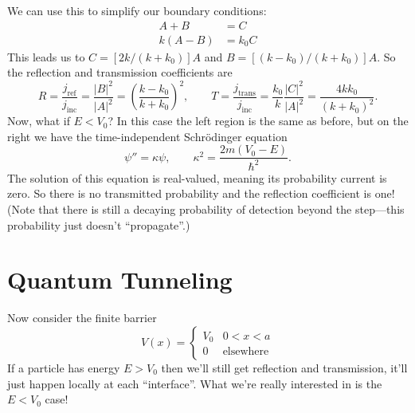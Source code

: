 \documentclass[../p052main.tex]{subfiles}
\begin{document}
We can use this to simplify our boundary conditions:
\begin{align*}
    A + B &= C \\
    k(A - B) &= k_0 C
\end{align*}
This leads us to $C = [2k / (k + k_0)] A$ and $B = [(k - k_0) / (k + k_0)]A$.
So the reflection and transmission coefficients are
\[ R = \frac{j_\textrm{ref}}{j_\textrm{inc}} = \frac{|B|^2}{|A|^2} = \left( \frac{k - k_0}{k + k_0} \right)^2, \qquad T = \frac{j_\textrm{trans}}{j_\textrm{inc}} = \frac{k_0}{k} \frac{|C|^2}{|A|^2} = \frac{4kk_0}{(k + k_0)^2}. \]
Now, what if $E < V_0$?
In this case the left region is the same as before, but on the right we have the time-independent Schrödinger equation
\[ \psi'' = \kappa \psi, \qquad \kappa^2 = \frac{2m(V_0 - E)}{\hbar^2}. \]
The solution of this equation is real-valued, meaning its probability current is zero.
So there is no transmitted probability and the reflection coefficient is one!
(Note that there is still a decaying probability of detection beyond the step---this probability just doesn't ``propagate''.)


\section{Quantum Tunneling}
Now consider the finite barrier
\[ V(x) = \begin{cases} V_0 & 0 < x < a \\ 0 & \text{elsewhere} \end{cases} \]
If a particle has energy $E > V_0$ then we'll still get reflection and transmission, it'll just happen locally at each ``interface''.
What we're really interested in is the $E < V_0$ case!
\end{document}
